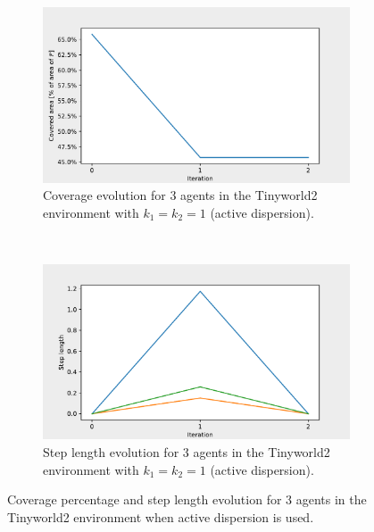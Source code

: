 \begin{figure}[H]
  \centering
  \begin{subfigure}[t]{0.5\textwidth}
    \centering
    \includegraphics[width=\textwidth]{figs/tinyworld2_3_agnt_k_1_1_k_2_1_area_traj.pdf}
    \caption{Coverage evolution for 3 agents in the Tinyworld2 environment with $k_{1} = k_{2} = 1$ (active dispersion).}
    \label{fig:3_agnt_tw2_k_1_1_a_traj}
  \end{subfigure}%
  ~ 
  \begin{subfigure}[t]{0.5\textwidth}
    \centering
    \includegraphics[width=\textwidth]{figs/tinyworld2_3_agnt_k_1_1_k_2_1_step_traj.pdf}
    \caption{Step length evolution for 3 agents in the Tinyworld2 environment with $k_{1} = k_{2} = 1$ (active dispersion).}
    \label{fig:3_agnt_tw2_k_1_1_s_traj}
  \end{subfigure}
  \caption{Coverage percentage and step length evolution for 3 agents in the Tinyworld2 environment when active dispersion is used.}
  \label{fig:3_agnt_tw2_evolution_active}
\end{figure}

